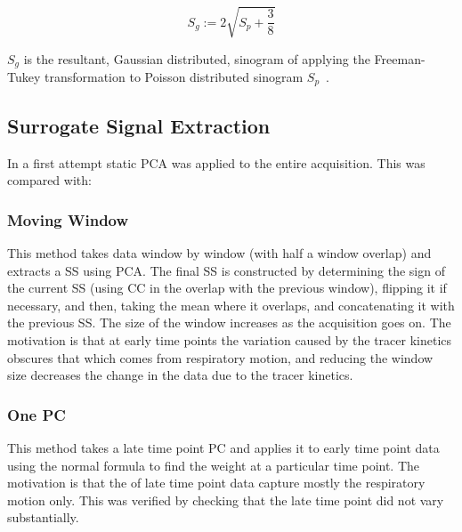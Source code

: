                 \begin{equation}
                    S_g := 2 \sqrt{S_p + \frac{3}{8}}
                \end{equation}

                \noindent $S_g$ is the resultant, Gaussian distributed, sinogram of applying the Freeman-Tukey transformation to Poisson distributed sinogram $S_p$~\cite{Freeman1950TransformationsRoot}.
            
            \subsection{Surrogate Signal Extraction} \label{sec:surrogate_signal_extraction}
                In a first attempt static \gls{PCA} was applied to the entire acquisition. This was compared with:
                
                \subsubsection{Moving Window} \label{sec:pca_data_driven_surrogate_signal_extraction_methods_for_Dynamic_pet_moving_window}
                    This method takes data window by window (with half a window overlap) and extracts a \gls{SS} using \gls{PCA}. The final \gls{SS} is constructed by determining the sign of the current \gls{SS} (using \gls{CC} in the overlap with the previous window), flipping it if necessary, and then, taking the mean where it overlaps, and concatenating it with the previous \gls{SS}. The size of the window increases as the acquisition goes on. The motivation is that at early time points the variation caused by the tracer kinetics obscures that which comes from respiratory motion, and reducing the window size decreases the change in the data due to the tracer kinetics.
                
                \subsubsection{One \gls{PC}} \label{sec:pca_data_driven_surrogate_signal_extraction_methods_for_Dynamic_pet_one_pc}
                    This method takes a late time point \gls{PC} and applies it to early time point data using the normal formula to find the weight at a particular time point. The motivation is that the  of late time point data capture mostly the respiratory motion only. This was verified by checking that the late time point  did not vary substantially.
            
